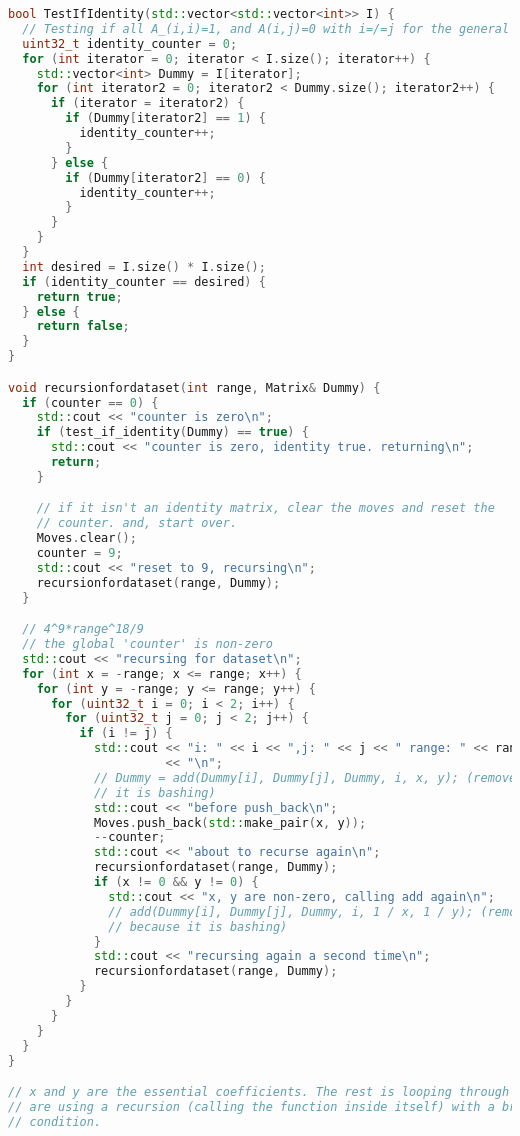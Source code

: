 \documentclass{article}
\begin{document}
\begin{lstlisting}[language=C++]
bool TestIfIdentity(std::vector<std::vector<int>> I) {
  // Testing if all A_(i,i)=1, and A(i,j)=0 with i=/=j for the general case
  uint32_t identity_counter = 0;
  for (int iterator = 0; iterator < I.size(); iterator++) {
    std::vector<int> Dummy = I[iterator];
    for (int iterator2 = 0; iterator2 < Dummy.size(); iterator2++) {
      if (iterator = iterator2) {
        if (Dummy[iterator2] == 1) {
          identity_counter++;
        }
      } else {
        if (Dummy[iterator2] == 0) {
          identity_counter++;
        }
      }
    }
  }
  int desired = I.size() * I.size();
  if (identity_counter == desired) {
    return true;
  } else {
    return false;
  }
}

void recursionfordataset(int range, Matrix& Dummy) {
  if (counter == 0) {
    std::cout << "counter is zero\n";
    if (test_if_identity(Dummy) == true) {
      std::cout << "counter is zero, identity true. returning\n";
      return;
    }

    // if it isn't an identity matrix, clear the moves and reset the
    // counter. and, start over.
    Moves.clear();
    counter = 9;
    std::cout << "reset to 9, recursing\n";
    recursionfordataset(range, Dummy);
  }

  // 4^9*range^18/9
  // the global 'counter' is non-zero
  std::cout << "recursing for dataset\n";
  for (int x = -range; x <= range; x++) {
    for (int y = -range; y <= range; y++) {
      for (uint32_t i = 0; i < 2; i++) {
        for (uint32_t j = 0; j < 2; j++) {
          if (i != j) {
            std::cout << "i: " << i << ",j: " << j << " range: " << range
                      << "\n";
            // Dummy = add(Dummy[i], Dummy[j], Dummy, i, x, y); (removed because
            // it is bashing)
            std::cout << "before push_back\n";
            Moves.push_back(std::make_pair(x, y));
            --counter;
            std::cout << "about to recurse again\n";
            recursionfordataset(range, Dummy);
            if (x != 0 && y != 0) {
              std::cout << "x, y are non-zero, calling add again\n";
              // add(Dummy[i], Dummy[j], Dummy, i, 1 / x, 1 / y); (removed
              // because it is bashing)
            }
            std::cout << "recursing again a second time\n";
            recursionfordataset(range, Dummy);
          }
        }
      }
    }
  }
}

// x and y are the essential coefficients. The rest is looping through Dummy. We
// are using a recursion (calling the function inside itself) with a break
// condition.


\end{lstlisting}
\end{document}
